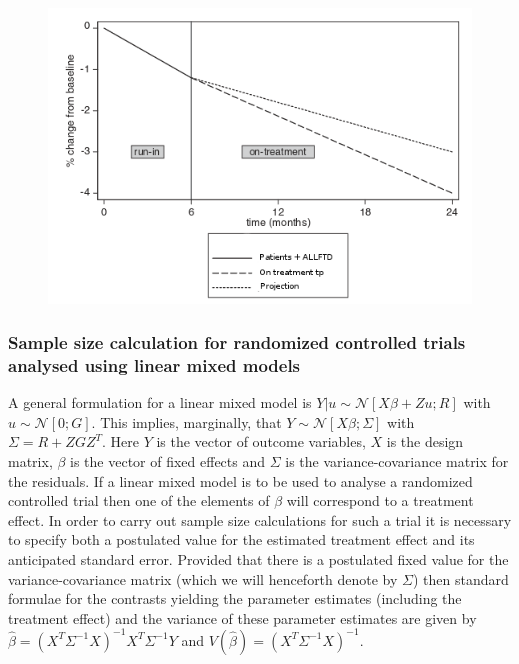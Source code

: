 \documentclass[final, paper=letter,5p,times,twocolumn]{elsarticle}
\theoremstyle{definition}
\begin{document}
\begin{figure}[h]
  \includegraphics[scale=0.5, angle=0]{images/Run-in_run.png}
  \label{fig:Run_in}
\end{figure}

\subsubsection{Sample size calculation for randomized controlled trials analysed using linear mixed models}

A general formulation for a linear mixed model is $Y|u \sim \mathcal{N}\left[ X\beta + Zu ; R\right]$ with $u \sim \mathcal{N}[0;G]$. This implies, marginally, that $Y \sim \mathcal{N}\left[ X\beta ; \Sigma\right]$ with $\Sigma = R + ZGZ^{T}$. Here $Y$ is the vector of outcome variables, $X$ is the design matrix, $\beta$ is the vector of fixed effects and $\Sigma$ is the variance-covariance matrix for the residuals. If a linear mixed model is to be used to analyse a randomized controlled trial then one of the elements of $\beta$ will correspond to a treatment effect. In order to carry out sample size calculations for such a trial it is necessary to specify both a postulated value for the estimated treatment effect and its anticipated standard error. Provided that there is a postulated fixed value for the variance-covariance matrix (which we will henceforth denote by $\Sigma$) then standard formulae for the contrasts yielding the parameter estimates (including the treatment effect) and the variance of these parameter estimates are given by $\hat{\beta} = (X^{T}\Sigma^{-1}X)^{-1}X^{T}\Sigma^{-1}Y$ and $V(\hat{\beta}) = (X^{T}\Sigma^{-1}X)^{-1}$.
\end{document}
